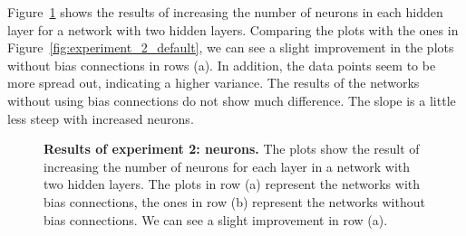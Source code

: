Figure~\ref{fig:experiment_2_neurons} shows the results of increasing the number of neurons in each hidden layer for a network with two hidden layers. Comparing the plots with the ones in Figure~\ref{fig:experiment_2_default}, we can see a slight improvement in the plots without bias connections in rows (a). In addition, the data points seem to be more spread out, indicating a higher variance. The results of the networks without using bias connections do not show much difference. The slope is a little less steep with increased neurons.
\begin{figure}[!ht]
\begin{figrow}
\item \label{row:NN_with_bias_neurons} 
\item \label{row:NN_without_neurons}  
\end{figrow}
\caption[Results of experiment 2: neurons]{
  \textbf{Results of experiment 2: neurons.}
  The plots show the result of increasing the number of neurons for each layer in a network with two hidden layers. The plots in row (a) represent the networks with bias connections, the ones in row (b) represent the networks without bias connections. We can see a slight improvement in row (a).
}
\label{fig:experiment_2_neurons}
\end{figure}

